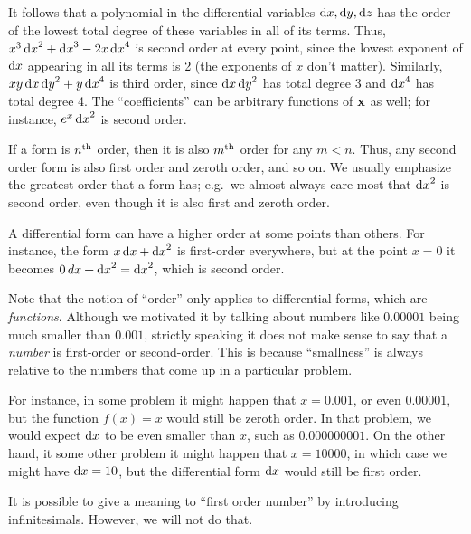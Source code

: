 \documentclass{amsart}
\begin{document}
It follows that a polynomial in the differential variables ${\mathrm{d} x},{\mathrm{d} y},{\mathrm{d} z}$ has the order of the lowest total degree of these variables in all of its terms.
Thus, $x^3\, {\mathrm{d} x}^2 + {\mathrm{d} x}^3 - 2x \,{\mathrm{d} x}^4$ is second order at every point, since the lowest exponent of ${\mathrm{d} x}$ appearing in all its terms is 2 (the exponents of $x$ don't matter).
Similarly, $xy\,{\mathrm{d} x}\,{\mathrm{d} y}^2 + y\, {\mathrm{d} x}^4$ is third order, since ${\mathrm{d} x}\,{\mathrm{d} y}^2$ has total degree 3 and ${\mathrm{d} x}^4$ has total degree 4.
The ``coefficients'' can be arbitrary functions of $\mathbf{x}$ as well; for instance, $e^x \,{\mathrm{d} x}^2$ is second order.

\begin{rmk}
  If a form is $n^{\mathrm{th}}$ order, then it is also $m^{\mathrm{th}}$ order for any $m<n$.
  Thus, any second order form is also first order and zeroth order, and so on.
  We usually emphasize the greatest order that a form has; e.g.\ we almost always care most that ${\mathrm{d} x}^2$ is second order, even though it is also first and zeroth order.
\end{rmk}

\begin{eg}
  A differential form can have a higher order at some points than others.
  For instance, the form $x \,{\mathrm{d} x} + {\mathrm{d} x}^2$ is first-order everywhere, but at the point $x=0$ it becomes $0\, dx + {\mathrm{d} x}^2 = {\mathrm{d} x}^2$, which is second order.
\end{eg}

\begin{rmk}
  Note that the notion of ``order'' only applies to differential forms, which are \emph{functions}.
  Although we motivated it by talking about numbers like $0.00001$ being much smaller than $0.001$, strictly speaking it does not make sense to say that a \emph{number} is first-order or second-order.
  This is because ``smallness'' is always relative to the numbers that come up in a particular problem.

  For instance, in some problem it might happen that $x=0.001$, or even $0.00001$, but the function $f(x) = x$ would still be zeroth order.
  In that problem, we would expect ${\mathrm{d} x}$ to be even smaller than $x$, such as $0.000000001$.
  On the other hand, it some other problem it might happen that $x = 10000$, in which case we might have ${\mathrm{d} x} = 10$, but the differential form ${\mathrm{d} x}$ would still be first order.

  It is possible to give a meaning to ``first order number'' by introducing infinitesimals.
  However, we will not do that.
\end{rmk}
\end{document}
